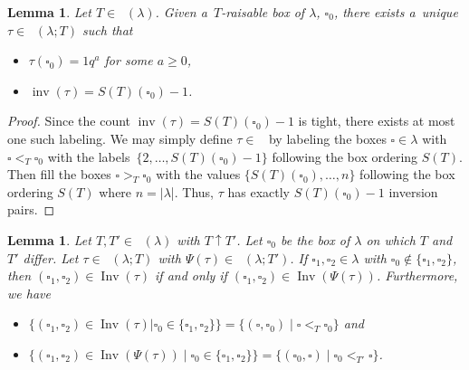 \documentclass[10pt,a4paper]{amsart}
\numberwithin{equation}{section}
\newtheorem{Lemma}[Theorem]{Lemma}
\theoremstyle{definition}
\DeclareMathOperator{\PSYT}{\mathrm{PSYT}_{\geq 0}}
\DeclareMathOperator{\RSSYT}{\mathrm{RSSYT}_{\geq 0}}
\DeclareMathOperator{\Inv}{\mathrm{Inv}}
\DeclareMathOperator{\inv}{inv}
\begin{document}
\begin{Lemma}\label{minimal inversion set for raisable labeling}
 Let $T\in \RSSYT(\lambda)$. Given a~$T$-raisable box of $\lambda$, $\square_0$, there exists a~unique $\tau \in \PSYT(\lambda;T)$ such that
 \begin{itemize}
\itemsep=0pt
 \item $\tau(\square_0)= 1q^{a}$ for some $a \geq 0$,
 \item $\inv(\tau) = S(T)(\square_0) -1$.
 \end{itemize}
\end{Lemma}

\begin{proof}
 Since the count $\inv(\tau) = S(T)(\square_0) -1$ is tight, there exists at most one such labeling. We may simply define $\tau \in \PSYT$ by labeling the boxes $\square \in \lambda$ with $\square <_{T} \square_0$ with the labels~${\{2,\dots, S(T)(\square_0) -1 \}}$ following the box ordering $S(T)$. Then fill the boxes $\square >_T \square_0$ with the values $\{ S(T)(\square_0),\dots, n\}$ following the box ordering $S(T)$ where $n = |\lambda$|. Thus, $\tau$ has exactly $S(T)(\square_0) -1$ inversion pairs.
\end{proof}

\begin{Lemma}\label{inversion sets and raising}
 Let $T,T' \in \RSSYT(\lambda)$ with $T\uparrow T'$. Let $\square_0$ be the box of $\lambda$ on which $T$ and $T'$ differ.
 Let $\tau \in \PSYT(\lambda;T)$ with $\Psi(\tau) \in \PSYT(\lambda;T')$. If $\square_1,\square_2 \in \lambda$ with $\square_0 \notin \{\square_1,\square_2\}$, then $(\square_1,\square_2) \in \Inv(\tau)$ if and only if $(\square_1,\square_2) \in \Inv(\Psi(\tau))$. Furthermore, we have
 \begin{itemize}
\itemsep=0pt
 \item $\{(\square_1,\square_2) \in \Inv(\tau)| \square_0 \in \{\square_1,\square_2\} \} = \{ (\square,\square_0) \mid \square <_{T} \square_0\}$ and
 \item $\{(\square_1,\square_2) \in \Inv(\Psi(\tau)) \mid \square_0 \in \{\square_1,\square_2\}\} = \{ (\square_0,\square) \mid \square_0 <_{T'} \square\}$.
 \end{itemize}
\end{Lemma}
\end{document}
